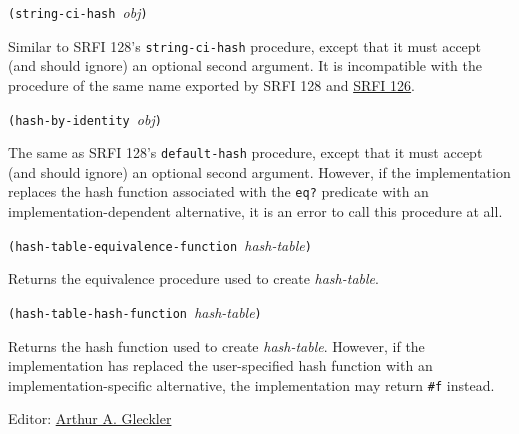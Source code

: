 \texttt{(string-ci-hash\ }\emph{obj}\texttt{)}

Similar to SRFI 128's \texttt{string-ci-hash} procedure, except that it
must accept (and should ignore) an optional second argument. It is
incompatible with the procedure of the same name exported by SRFI 128
and \href{http://srfi.schemers.org/srfi-126/srfi-126.html}{SRFI 126}.

\texttt{(hash-by-identity\ }\emph{obj}\texttt{)}

The same as SRFI 128's \texttt{default-hash} procedure, except that it
must accept (and should ignore) an optional second argument. However, if
the implementation replaces the hash function associated with the
\texttt{eq?} predicate with an implementation-dependent alternative, it
is an error to call this procedure at all.

\texttt{(hash-table-equivalence-function\ }\emph{hash-table}\texttt{)}

Returns the equivalence procedure used to create \emph{hash-table}.

\texttt{(hash-table-hash-function\ }\emph{hash-table}\texttt{)}

Returns the hash function used to create \emph{hash-table}. However, if
the implementation has replaced the user-specified hash function with an
implementation-specific alternative, the implementation may return
\texttt{\#f} instead.

Editor:
\href{mailto:srfi-editors\%20at\%20srfi\%20dot\%20schemers\%20dot\%20org}{Arthur
A. Gleckler}
